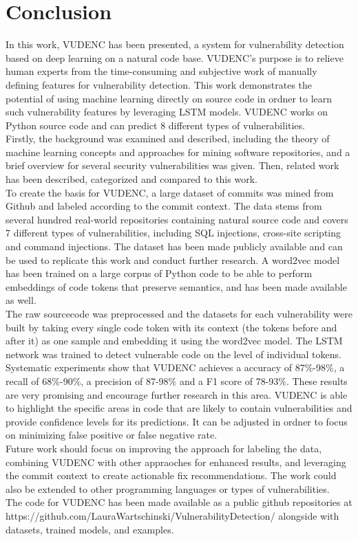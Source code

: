 \documentclass[
a4paper,
pagesize,
pdftex,
12pt,
twoside, %
BCOR=5mm, %
ngerman,
fleqn,
final,
]{scrartcl}
\begin{document}
	
	\newpage
	\setcounter{secnumdepth}{0} %
	\section{Conclusion}
	In this work, VUDENC has been presented, a system for vulnerability detection based on deep learning on a natural code base. VUDENC's purpose is to relieve human experts from the time-consuming and subjective work of manually defining features for vulnerability detection. This work demonstrates the potential of using machine learning directly on source code in ordner to learn such vulnerability features by leveraging LSTM models. VUDENC works on Python source code and can predict 8 different types of vulnerabilities.\\
	Firstly, the background was examined and described, including the theory of machine learning concepts and approaches for mining software repositories, and a brief overview for several security vulnerabilities was given. Then, related work has been described, categorized and compared to this work.\\
	To create the basis for VUDENC, a large dataset of commits was mined from Github and labeled according to the commit context. The data stems from several hundred real-world repositories containing natural source code and covers 7 different types of vulnerabilities, including SQL injections, cross-site scripting and command injections. The dataset has been made publicly available and can be used to replicate this work and conduct further research. A word2vec model has been trained on a large corpus of Python code to be able to perform embeddings of code tokens that preserve semantics, and has been made available as well.\\
	The raw sourcecode was preprocessed and the datasets for each vulnerability were built by taking every single code token with its context (the tokens before and after it) as one sample and embedding it using the word2vec model. The LSTM network was trained to detect vulnerable code on the level of individual tokens.\\
	Systematic experiments show that VUDENC achieves a accuracy of 87\%-98\%, a recall of 68\%-90\%, a precision of 87-98\% and a F1 score of 78-93\%.  These results are very promising and encourage further research in this area. VUDENC is able to highlight the specific areas in code that are likely to contain vulnerabilities and provide confidence levels for its predictions. It can be adjusted in ordner to focus on minimizing false positive or false negative rate. \\
	Future work should focus on improving the approach for labeling the data, combining VUDENC with other appraoches for enhanced results, and leveraging the commit context to create actionable fix recommendations. The work could also be extended to other programming languages or types of vulnerabilities.\\
	The code for VUDENC has been made available as a public github repositories at https://github.com/LauraWartschinski/VulnerabilityDetection/ alongside with datasets, trained models, and examples.
		
\end{document}
